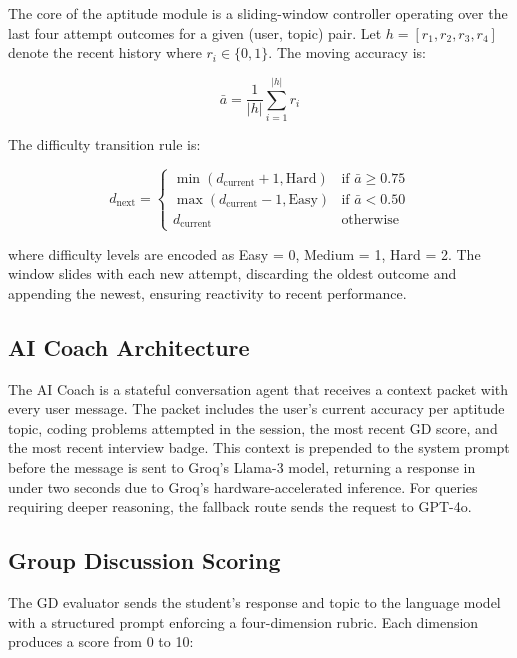 \documentclass[12pt,a4paper]{report}
\begin{document}
The core of the aptitude module is a sliding-window controller operating over the last four attempt outcomes for a given (user, topic) pair. Let $h = [r_1, r_2, r_3, r_4]$ denote the recent history where $r_i \in \{0, 1\}$. The moving accuracy is:

\begin{equation}
    \bar{a} = \frac{1}{|h|} \sum_{i=1}^{|h|} r_i
\end{equation}

The difficulty transition rule is:

\begin{equation}
    d_{\text{next}} = \begin{cases}
        \min(d_{\text{current}} + 1, \text{Hard}) & \text{if } \bar{a} \geq 0.75 \\
        \max(d_{\text{current}} - 1, \text{Easy}) & \text{if } \bar{a} < 0.50 \\
        d_{\text{current}} & \text{otherwise}
    \end{cases}
\end{equation}

where difficulty levels are encoded as Easy = 0, Medium = 1, Hard = 2. The window slides with each new attempt, discarding the oldest outcome and appending the newest, ensuring reactivity to recent performance.

\subsection{AI Coach Architecture}

The AI Coach is a stateful conversation agent that receives a context packet with every user message. The packet includes the user's current accuracy per aptitude topic, coding problems attempted in the session, the most recent GD score, and the most recent interview badge. This context is prepended to the system prompt before the message is sent to Groq's Llama-3 model, returning a response in under two seconds due to Groq's hardware-accelerated inference. For queries requiring deeper reasoning, the fallback route sends the request to GPT-4o.

\subsection{Group Discussion Scoring}

The GD evaluator sends the student's response and topic to the language model with a structured prompt enforcing a four-dimension rubric. Each dimension produces a score from 0 to 10:
\end{document}
